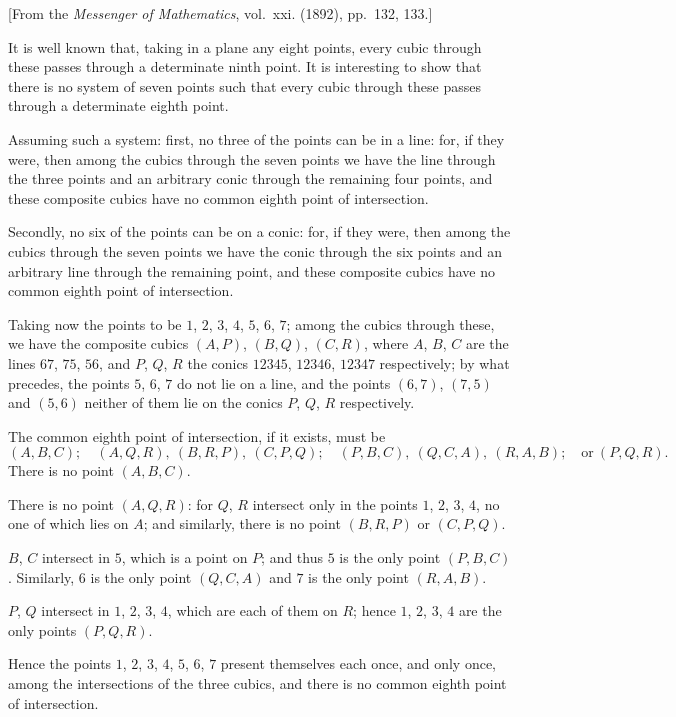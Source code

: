 \documentclass[12pt,a4paper]{article}
\begin{document}
[From the \textit{Messenger of Mathematics}, vol.~xxi. (1892), pp.~132, 133.]

\bigskip

It is well known that, taking in a plane any eight points, every cubic through
these passes through a determinate ninth point. It is interesting to show that there
is no system of seven points such that every cubic through these passes through a
determinate eighth point.

Assuming such a system: first, no three of the points can be in a line: for, if
they were, then among the cubics through the seven points we have the line
through the three points and an arbitrary conic through the remaining four points,
and these composite cubics have no common eighth point of intersection.

Secondly, no six of the points can be on a conic: for, if they were, then among
the cubics through the seven points we have the conic through the six points and
an arbitrary line through the remaining point, and these composite cubics have no
common eighth point of intersection.

Taking now the points to be $1$, $2$, $3$, $4$, $5$, $6$, $7$; among the cubics through
these, we have the composite cubics $(A, P)$, $(B, Q)$, $(C, R)$, where $A$, $B$, $C$ are the
lines $67$, $75$, $56$, and $P$, $Q$, $R$ the conics $12345$, $12346$, $12347$ respectively; by what
precedes, the points $5$, $6$, $7$ do not lie on a line, and the points $(6, 7)$, $(7, 5)$ and
$(5, 6)$ neither of them lie on the conics $P$, $Q$, $R$ respectively.

The common eighth point of intersection, if it exists, must be
\[
(A, B, C);\quad (A, Q, R),\ (B, R, P),\ (C, P, Q);\quad
(P, B, C),\ (Q, C, A),\ (R, A, B);\quad \text{or}\ (P, Q, R).
\]
There is no point $(A, B, C)$.

There is no point $(A, Q, R)$: for $Q$, $R$ intersect only in the points $1$, $2$, $3$, $4$,
no one of which lies on $A$; and similarly, there is no point $(B, R, P)$ or $(C, P, Q)$.

$B$, $C$ intersect in $5$, which is a point on $P$; and thus $5$ is the only point
$(P, B, C)$. Similarly, $6$ is the only point $(Q, C, A)$ and $7$ is the only point $(R, A, B)$.

$P$, $Q$ intersect in $1$, $2$, $3$, $4$, which are each of them on $R$; hence $1$, $2$, $3$, $4$
are the only points $(P, Q, R)$.

Hence the points $1$, $2$, $3$, $4$, $5$, $6$, $7$ present themselves each once, and only
once, among the intersections of the three cubics, and there is no common eighth point
of intersection.
\end{document}

